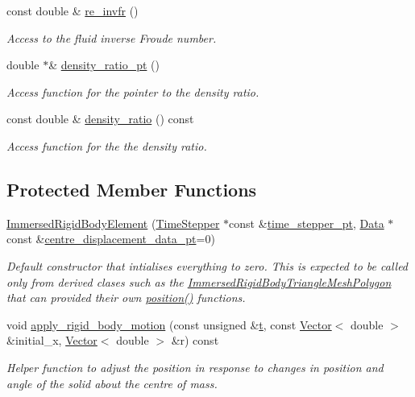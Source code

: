 \begin{DoxyCompactItemize}
const double \& \hyperlink{classoomph_1_1ImmersedRigidBodyElement_ad5082011e8c4db0def4044b05314d149}{re\+\_\+invfr} ()
\begin{DoxyCompactList}\small\item\em Access to the fluid inverse Froude number. \end{DoxyCompactList}\item 
double $\ast$\& \hyperlink{classoomph_1_1ImmersedRigidBodyElement_a8d7b1180f19e84d85ee1415a811a0047}{density\+\_\+ratio\+\_\+pt} ()
\begin{DoxyCompactList}\small\item\em Access function for the pointer to the density ratio. \end{DoxyCompactList}\item 
const double \& \hyperlink{classoomph_1_1ImmersedRigidBodyElement_af080ce9be7657e243e94ab303d5b52b1}{density\+\_\+ratio} () const
\begin{DoxyCompactList}\small\item\em Access function for the the density ratio. \end{DoxyCompactList}\end{DoxyCompactItemize}
\subsection*{Protected Member Functions}
\begin{DoxyCompactItemize}
\item 
\hyperlink{classoomph_1_1ImmersedRigidBodyElement_a085973f0fc1fe69839a632811ea8702b}{Immersed\+Rigid\+Body\+Element} (\hyperlink{classoomph_1_1TimeStepper}{Time\+Stepper} $\ast$const \&\hyperlink{classoomph_1_1GeomObject_a3c92023891dd4a0e818022f467eeb7f1}{time\+\_\+stepper\+\_\+pt}, \hyperlink{classoomph_1_1Data}{Data} $\ast$const \&\hyperlink{classoomph_1_1ImmersedRigidBodyElement_ac1e912d596869720566ab2264aa60d6c}{centre\+\_\+displacement\+\_\+data\+\_\+pt}=0)
\begin{DoxyCompactList}\small\item\em Default constructor that intialises everything to zero. This is expected to be called only from derived clases such as the \hyperlink{classoomph_1_1ImmersedRigidBodyTriangleMeshPolygon}{Immersed\+Rigid\+Body\+Triangle\+Mesh\+Polygon} that can provided their own \hyperlink{classoomph_1_1ImmersedRigidBodyElement_a14f5acb186ecd1168dfa08dcf242c538}{position()} functions. \end{DoxyCompactList}\item 
void \hyperlink{classoomph_1_1ImmersedRigidBodyElement_af115b2b370039678ebe619be333efc9f}{apply\+\_\+rigid\+\_\+body\+\_\+motion} (const unsigned \&\hyperlink{cfortran_8h_af6f0bd3dc13317f895c91323c25c2b8f}{t}, const \hyperlink{classoomph_1_1Vector}{Vector}$<$ double $>$ \&initial\+\_\+x, \hyperlink{classoomph_1_1Vector}{Vector}$<$ double $>$ \&r) const
\begin{DoxyCompactList}\small\item\em Helper function to adjust the position in response to changes in position and angle of the solid about the centre of mass. \end{DoxyCompactList}\end{DoxyCompactItemize}
